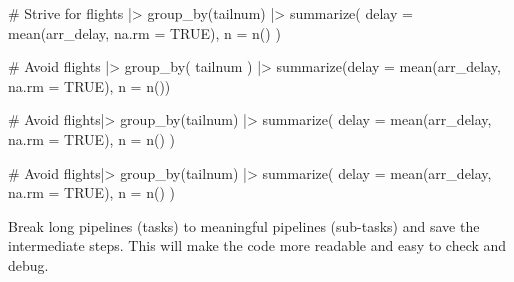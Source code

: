 \documentclass[
  letterpaper,
  DIV=11,
  numbers=noendperiod]{scrreprt}
\newenvironment{Shaded}{\begin{snugshade}}{\end{snugshade}}
\newcommand{\AttributeTok}[1]{\textcolor[rgb]{0.40,0.45,0.13}{#1}}
\newcommand{\CommentTok}[1]{\textcolor[rgb]{0.37,0.37,0.37}{#1}}
\newcommand{\ConstantTok}[1]{\textcolor[rgb]{0.56,0.35,0.01}{#1}}
\newcommand{\FunctionTok}[1]{\textcolor[rgb]{0.28,0.35,0.67}{#1}}
\newcommand{\NormalTok}[1]{\textcolor[rgb]{0.00,0.23,0.31}{#1}}
\newcommand{\SpecialCharTok}[1]{\textcolor[rgb]{0.37,0.37,0.37}{#1}}
\begin{document}
\begin{Shaded}
\begin{Highlighting}[]
\CommentTok{\# Strive for}
\NormalTok{flights }\SpecialCharTok{|\textgreater{}}  
  \FunctionTok{group\_by}\NormalTok{(tailnum) }\SpecialCharTok{|\textgreater{}} 
  \FunctionTok{summarize}\NormalTok{(}
    \AttributeTok{delay =} \FunctionTok{mean}\NormalTok{(arr\_delay, }\AttributeTok{na.rm =} \ConstantTok{TRUE}\NormalTok{),}
    \AttributeTok{n =} \FunctionTok{n}\NormalTok{()}
\NormalTok{  )}

\CommentTok{\# Avoid}
\NormalTok{flights }\SpecialCharTok{|\textgreater{}}
  \FunctionTok{group\_by}\NormalTok{(}
\NormalTok{    tailnum}
\NormalTok{  ) }\SpecialCharTok{|\textgreater{}} 
  \FunctionTok{summarize}\NormalTok{(}\AttributeTok{delay =} \FunctionTok{mean}\NormalTok{(arr\_delay, }\AttributeTok{na.rm =} \ConstantTok{TRUE}\NormalTok{), }\AttributeTok{n =} \FunctionTok{n}\NormalTok{())}

\CommentTok{\# Avoid}
\NormalTok{flights}\SpecialCharTok{|\textgreater{}}
  \FunctionTok{group\_by}\NormalTok{(tailnum) }\SpecialCharTok{|\textgreater{}} 
  \FunctionTok{summarize}\NormalTok{(}
             \AttributeTok{delay =} \FunctionTok{mean}\NormalTok{(arr\_delay, }\AttributeTok{na.rm =} \ConstantTok{TRUE}\NormalTok{), }
             \AttributeTok{n =} \FunctionTok{n}\NormalTok{()}
\NormalTok{           )}

\CommentTok{\# Avoid}
\NormalTok{flights}\SpecialCharTok{|\textgreater{}}
  \FunctionTok{group\_by}\NormalTok{(tailnum) }\SpecialCharTok{|\textgreater{}} 
  \FunctionTok{summarize}\NormalTok{(}
  \AttributeTok{delay =} \FunctionTok{mean}\NormalTok{(arr\_delay, }\AttributeTok{na.rm =} \ConstantTok{TRUE}\NormalTok{), }
  \AttributeTok{n =} \FunctionTok{n}\NormalTok{()}
\NormalTok{  )}
\end{Highlighting}
\end{Shaded}

\begin{tcolorbox}[enhanced jigsaw, opacityback=0, title=\textcolor{quarto-callout-note-color}{\faInfo}\hspace{0.5em}{Long Pipeline}, colback=white, leftrule=.75mm, colbacktitle=quarto-callout-note-color!10!white, bottomrule=.15mm, colframe=quarto-callout-note-color-frame, arc=.35mm, bottomtitle=1mm, coltitle=black, toptitle=1mm, toprule=.15mm, opacitybacktitle=0.6, rightrule=.15mm, titlerule=0mm, breakable, left=2mm]

Break long pipelines (tasks) to meaningful pipelines (sub-tasks) and
save the intermediate steps. This will make the code more readable and
easy to check and debug.

\end{tcolorbox}
\end{document}

